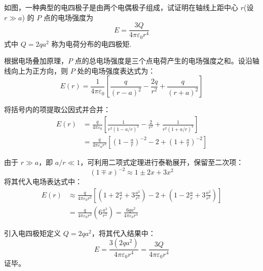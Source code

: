 \begin{exercise}\label{ex:15.3}
如图，一种典型的电四极子是由两个电偶极子组成，试证明在轴线上距中心 $r$(设 $r \gg a$) 的 $P$ 点的电场强度为
$$ E = \frac{3Q}{4\pi\varepsilon_0 r^4} $$
式中 $Q = 2qa^2$ 称为电荷分布的电四极矩.
\begin{center}
\end{center}
\end{exercise}
\begin{solution}
根据电场叠加原理，$P$ 点的总电场强度是三个点电荷产生的电场强度之和。设沿轴线向上为正方向，则 $P$ 处的电场强度表达式为：
$$ E(r) = \frac{1}{4\pi\varepsilon_0} \left[ \frac{q}{(r - a)^2} - \frac{2q}{r^2} + \frac{q}{(r + a)^2} \right] $$

将括号内的项提取公因式并合并：
\begin{align*}
E(r) &= \frac{q}{4\pi\varepsilon_0} \left[ \frac{1}{r^2(1 - a/r)^2} - \frac{2}{r^2} + \frac{1}{r^2(1 + a/r)^2} \right] \\
     &= \frac{q}{4\pi\varepsilon_0 r^2} \left[ (1 - \frac{a}{r})^{-2} - 2 + (1 + \frac{a}{r})^{-2} \right]
\end{align*}

由于 $r \gg a$，即 $a/r \ll 1$，可利用二项式定理进行泰勒展开，保留至二次项：
$$ (1 \mp x)^{-2} \approx 1 \pm 2x + 3x^2 $$
将其代入电场表达式中：
\begin{align*}
E(r) &\approx \frac{q}{4\pi\varepsilon_0 r^2} \left[ \left(1 + 2\frac{a}{r} + 3\frac{a^2}{r^2}\right) - 2 + \left(1 - 2\frac{a}{r} + 3\frac{a^2}{r^2}\right) \right] \\
     &= \frac{q}{4\pi\varepsilon_0 r^2} \left( 6\frac{a^2}{r^2} \right) = \frac{6qa^2}{4\pi\varepsilon_0 r^4}
\end{align*}

引入电四极矩定义 $Q = 2qa^2$，将其代入结果中：
$$ E = \frac{3(2qa^2)}{4\pi\varepsilon_0 r^4} = \frac{3Q}{4\pi\varepsilon_0 r^4} $$
证毕。
\end{solution}


